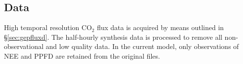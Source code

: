 \subsection{Data}
\label{sec:mst1data}
High temporal resolution CO$_2$ flux data is acquired by means outlined in \S \ref{sec:gepfluxd}.  
The half-hourly synthesis data is processed to remove all non-observational and low quality data.  
In the current model, only observations of NEE and PPFD are retained from the original files.

